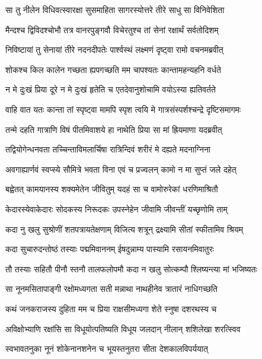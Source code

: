 
\twolineshloka
{सा तु नीलेन विधिवत्स्वारक्षा सुसमाहिता}
{सागरस्योत्तरे तीरे साधु सा विनिवेशिता} %

\twolineshloka
{मैन्दश्च द्विविदश्चोभौ तत्र वानरपुङ्गवौ}
{विचेरतुश्च तां सेनां रक्षार्थं सर्वतोदिशम्} %

\twolineshloka
{निविष्टायां तु सेनायां तीरे नदनदीपतेः}
{पार्श्वस्थं लक्ष्मणं दृष्ट्वा रामो वचनमब्रवीत्} %

\twolineshloka
{शोकश्च किल कालेन गच्छता ह्यपगच्छति}
{मम चापश्यतः कान्तामहन्यहनि वर्धते} %

\twolineshloka
{न मे दुःखं प्रिया दूरे न मे दुःखं हृतेति च}
{एतदेवानुशोचामि वयोऽस्या ह्यतिवर्तते} %

\twolineshloka
{वाहि वात यतः कान्ता तां स्पृष्ट्वा मामपि स्पृश}
{त्वयि मे गात्रसंस्पर्शश्चन्द्रे दृष्टिसमागमः} %

\twolineshloka
{तन्मे दहति गात्राणि विषं पीतमिवाशये}
{हा नाथेति प्रिया सा मां ह्रियमाणा यदब्रवीत्} %

\twolineshloka
{तद्वियोगेन्धनवता तच्चिन्ताविमलार्चिषा}
{रात्रिन्दिवं शरीरं मे दह्यते मदनाग्निना} %

\twolineshloka
{अवगाह्यार्णवं स्वप्स्ये सौमित्रे भवता विना}
{एवं च प्रज्वलन् कामो न मा सुप्तं जले दहेत्} %

\twolineshloka
{बह्वेतत् कामयानस्य शक्यमेतेन जीवितुम्}
{यदहं सा च वामोरुरेकां धरणिमाश्रितौ} %

\twolineshloka
{केदारस्येवाकेदारः सोदकस्य निरूदकः}
{उपस्नेहेन जीवामि जीवन्तीं यच्छृणोमि ताम्} %

\twolineshloka
{कदा नु खलु सुश्रोणीं शतपत्रायतेक्षणाम्}
{विजित्य शत्रून् द्रक्ष्यामि सीतां स्फीतामिव श्रियम्} %

\twolineshloka
{कदा सुचारुदन्तोष्ठं तस्याः पद्ममिवाननम्}
{ईषदुन्नाम्य पास्यामि रसायनमिवातुरः} %

\twolineshloka
{तौ तस्याः सहितौ पीनौ स्तनौ तालफलोपमौ}
{कदा न खलु सोत्कम्पौ श्लिष्यन्त्या मां भजिष्यतः} %

\twolineshloka
{सा नूनमसितापाङ्गी रक्षोमध्यगता सती}
{मन्नाथा नाथहीनेव त्रातारं नाधिगच्छति} %

\twolineshloka
{कथं जनकराजस्य दुहिता मम च प्रिया}
{राक्षसीमध्यगा शेते स्नुषा दशरथस्य च} %

\twolineshloka
{अविक्षोभ्याणि रक्षांसि सा विधूयोत्पतिष्यति}
{विधूय जलदान् नीलान् शशिलेखा शरत्स्विव} %

\twolineshloka
{स्वभावतनुका नूनं शोकेनानशनेन च}
{भूयस्तनुतरा सीता देशकालविपर्ययात्} %

